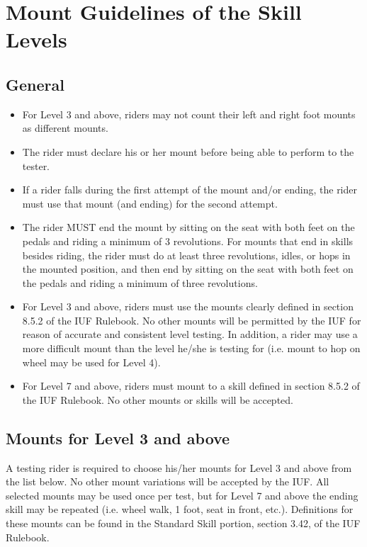 \section{Mount Guidelines of the Skill Levels}

\subsection{General}
\begin{itemize}
\item For Level 3 and above, riders may not count their left and right foot mounts as different mounts.
\item The rider must declare his or her mount before being able to perform to the tester.
\item If a rider falls during the first attempt of the mount and/or ending, the rider must use that mount (and ending) for the
second attempt.
\item The rider MUST end the mount by sitting on the seat with both feet on the pedals and riding a minimum of 3
revolutions. For mounts that end in skills besides riding, the rider must do at least three revolutions, idles, or hops
in the mounted position, and then end by sitting on the seat with both feet on the pedals and riding a minimum of
three revolutions.
\item For Level 3 and above, riders must use the mounts clearly defined in section 8.5.2 of the IUF Rulebook. No other mounts will be permitted by the IUF for reason of accurate and consistent level testing. In addition, a rider may use a more difficult mount than the level he/she is testing for (i.e. mount to hop on wheel may be used for Level 4).
\item For Level 7 and above, riders must mount to a skill defined in section 8.5.2 of the IUF Rulebook. No other mounts
or skills will be accepted.
\end{itemize}


\subsection{Mounts for Level 3 and above}
A testing rider is required to choose his/her mounts for Level 3 and above from the list below. No other mount
variations will be accepted by the IUF. All selected mounts may be used once per test, but for Level 7 and above the
ending skill may be repeated (i.e. wheel walk, 1 foot, seat in front, etc.). Definitions for these mounts can be found in
the Standard Skill portion, section 3.42, of the IUF Rulebook.

